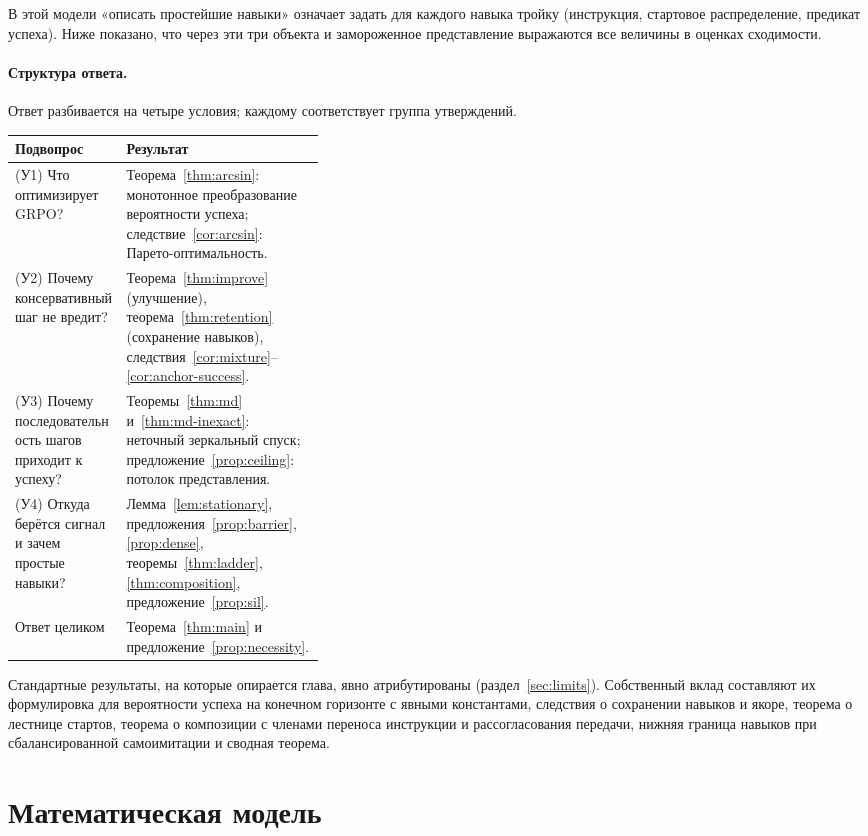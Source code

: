 \documentclass[11pt,a4paper]{article}
\theoremstyle{plain}
\theoremstyle{definition}
\theoremstyle{remark}
\begin{document}
В этой модели «описать простейшие навыки» означает задать для каждого навыка тройку (инструкция, стартовое распределение, предикат успеха). Ниже показано, что через эти три объекта и замороженное представление выражаются все величины в оценках сходимости.

\paragraph{Структура ответа.} Ответ разбивается на четыре условия; каждому соответствует группа утверждений.
\begin{center}
\begin{tabularx}{\linewidth}{>{\raggedright}p{0.36\linewidth}X}
\toprule
Подвопрос & Результат \\
\midrule
(У1) Что оптимизирует GRPO? & Теорема~\ref{thm:arcsin}: монотонное преобразование вероятности успеха; следствие~\ref{cor:arcsin}: Парето-оптимальность. \\
(У2) Почему консервативный шаг не вредит? & Теорема~\ref{thm:improve} (улучшение), теорема~\ref{thm:retention} (сохранение навыков), следствия~\ref{cor:mixture}--\ref{cor:anchor-success}. \\
(У3) Почему последовательность шагов приходит к успеху? & Теоремы~\ref{thm:md} и~\ref{thm:md-inexact}: неточный зеркальный спуск; предложение~\ref{prop:ceiling}: потолок представления. \\
(У4) Откуда берётся сигнал и зачем простые навыки? & Лемма~\ref{lem:stationary}, предложения~\ref{prop:barrier}, \ref{prop:dense}, теоремы~\ref{thm:ladder}, \ref{thm:composition}, предложение~\ref{prop:sil}. \\
Ответ целиком & Теорема~\ref{thm:main} и предложение~\ref{prop:necessity}. \\
\bottomrule
\end{tabularx}
\end{center}

Стандартные результаты, на которые опирается глава, явно атрибутированы (раздел~\ref{sec:limits}). Собственный вклад составляют их формулировка для вероятности успеха на конечном горизонте с явными константами, следствия о сохранении навыков и якоре, теорема о лестнице стартов, теорема о композиции с членами переноса инструкции и рассогласования передачи, нижняя граница навыков при сбалансированной самоимитации и сводная теорема.

\section{Математическая модель}\label{sec:model}
\end{document}
